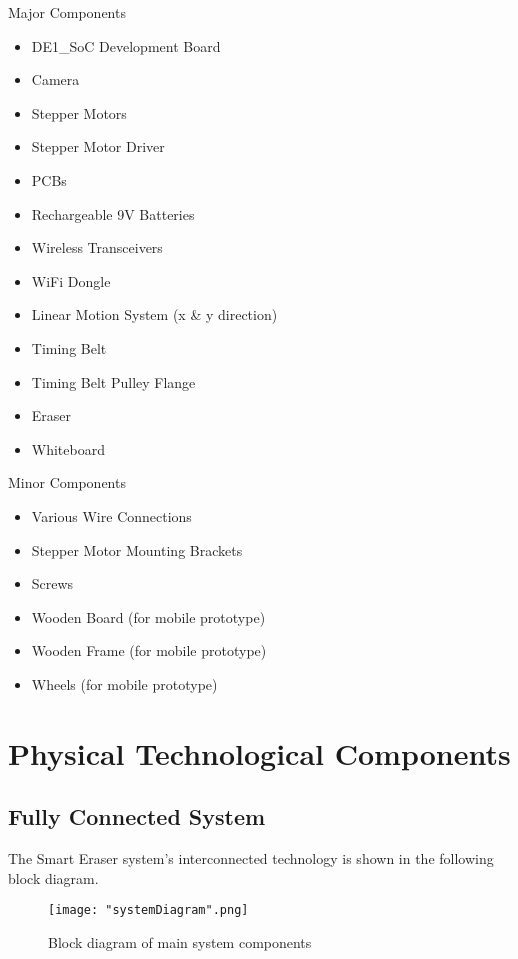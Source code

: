 Major Components
\begin{itemize}
	\item DE1\_SoC Development Board
	\item Camera
	\item Stepper Motors
	\item Stepper Motor Driver
	\item PCBs
	\item Rechargeable 9V Batteries
	\item Wireless Transceivers
	\item WiFi Dongle
	\item Linear Motion System (x \& y direction)
	\item Timing Belt
	\item Timing Belt Pulley Flange
	\item Eraser
	\item Whiteboard \\
\end{itemize}

Minor Components
\begin{itemize}
	\item Various Wire Connections
	\item Stepper Motor Mounting Brackets
	\item Screws
	\item Wooden Board (for mobile prototype)
	\item Wooden Frame (for mobile prototype)
	\item Wheels (for mobile prototype) \\
\end{itemize} \par 

\section{Physical Technological Components}

\subsection{Fully Connected System}

The Smart Eraser system’s interconnected technology is shown in the following block diagram. 

\begin{figure}[H]
	\centering
	{\texttt{[image: "systemDiagram".png]}}
	\caption{Block diagram of main system components}
	\label{fig:bd1}
\end{figure}

